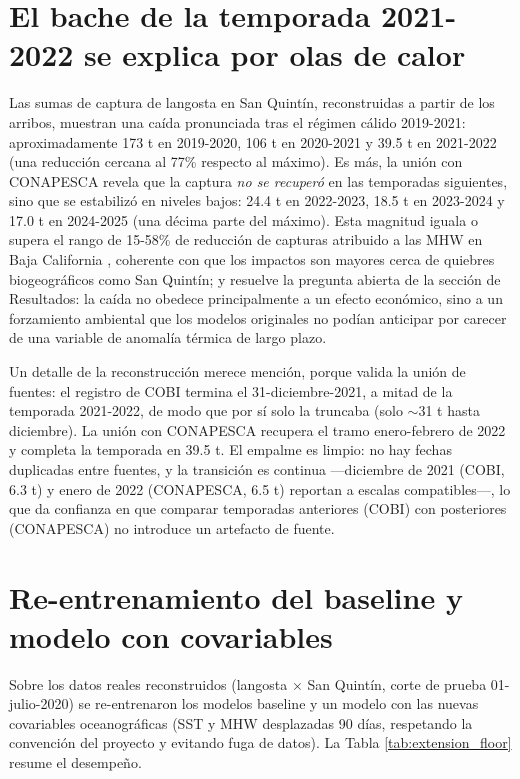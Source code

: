\section{El bache de la temporada 2021-2022 se explica por olas de calor}
Las sumas de captura de langosta en San Quintín, reconstruidas a partir de los arribos, muestran una caída pronunciada tras el régimen cálido 2019-2021: aproximadamente 173 t en 2019-2020, 106 t en 2020-2021 y 39.5 t en 2021-2022 (una reducción cercana al 77\% respecto al máximo). Es más, la unión con CONAPESCA revela que la captura \emph{no se recuperó} en las temporadas siguientes, sino que se estabilizó en niveles bajos: 24.4 t en 2022-2023, 18.5 t en 2023-2024 y 17.0 t en 2024-2025 (una décima parte del máximo). Esta magnitud iguala o supera el rango de 15-58\% de reducción de capturas atribuido a las MHW en Baja California \citep{villasenor2024}, coherente con que los impactos son mayores cerca de quiebres biogeográficos como San Quintín; y resuelve la pregunta abierta de la sección de Resultados: la caída no obedece principalmente a un efecto económico, sino a un forzamiento ambiental que los modelos originales no podían anticipar por carecer de una variable de anomalía térmica de largo plazo.

Un detalle de la reconstrucción merece mención, porque valida la unión de fuentes: el registro de COBI termina el 31-diciembre-2021, a mitad de la temporada 2021-2022, de modo que por sí solo la truncaba (solo $\sim$31 t hasta diciembre). La unión con CONAPESCA recupera el tramo enero-febrero de 2022 y completa la temporada en 39.5 t. El empalme es limpio: no hay fechas duplicadas entre fuentes, y la transición es continua ---diciembre de 2021 (COBI, 6.3 t) y enero de 2022 (CONAPESCA, 6.5 t) reportan a escalas compatibles---, lo que da confianza en que comparar temporadas anteriores (COBI) con posteriores (CONAPESCA) no introduce un artefacto de fuente.

\section{Re-entrenamiento del baseline y modelo con covariables}
Sobre los datos reales reconstruidos (langosta $\times$ San Quintín, corte de prueba 01-julio-2020) se re-entrenaron los modelos baseline y un modelo con las nuevas covariables oceanográficas (SST y MHW desplazadas 90 días, respetando la convención del proyecto y evitando fuga de datos). La Tabla \ref{tab:extension_floor} resume el desempeño.

